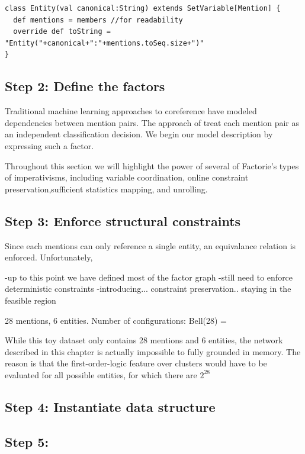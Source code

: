 \documentclass[]{manual}
\begin{document}
\begin{lstlisting}
class Entity(val canonical:String) extends SetVariable[Mention] {
  def mentions = members //for readability
  override def toString = "Entity("+canonical+":"+mentions.toSeq.size+")"
}
\end{lstlisting}

\subsection{Step 2: Define the factors}

Traditional machine learning approaches to coreference have modeled
dependencies between mention pairs. The approach of
\citep{soon01machine} treat each mention pair as an independent
classification decision. We begin our model description by expressing such a
factor.


Throughout this section we will highlight the power of several of
Factorie's types of imperativisms, including variable coordination,
online constraint preservation,sufficient statistics mapping, and
unrolling.


\subsection{Step 3: Enforce structural constraints}
Since each mentions can only reference a single entity, an equivalance relation is enforced. Unfortunately, 


-up to this point we have defined most of the factor graph
-still need to enforce deterministic constraints
-introducing... constraint preservation.. staying in the feasible region



28 mentions, 6 entities. Number of configurations: Bell(28) = 

While this toy dataset only contains 28 mentions and 6 entities, the
network described in this chapter is actually impossible to fully
grounded in memory. The reason is that the first-order-logic feature over clusters would have to be evaluated for all possible entities, for which there are $2^{28}$

\subsection{Step 4: Instantiate data structure}

\subsection{Step 5: }
\end{document}
